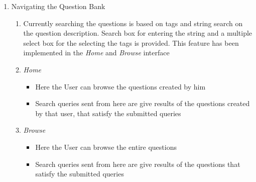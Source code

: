 \documentclass[a4paper,12pt,oneside]{book}
\begin{document}
\begin{enumerate}
        \item Navigating the Question Bank 
            \begin{enumerate}
                \item Currently searching the questions is based on tags and string search on the question description. Search box for entering the string and a multiple select box for the selecting the tags is provided. This feature has been implemented in the \textit{Home} and \textit{Browse} interface
                
                \item \textit{Home}
                    \begin{itemize}
                      \item Here the User can browse the questions created by him 
                      \item Search queries sent from here are give results of the questions created by that user, that satisfy the submitted queries
                    \end{itemize}
                    
                \item \textit{Browse}
                    \begin{itemize}
                      \item Here the User can browse the entire questions  
                      \item Search queries sent from here are give results of the questions that satisfy the submitted queries
                    \end{itemize}
            \end{enumerate}
            

\end{enumerate}
\end{document}
